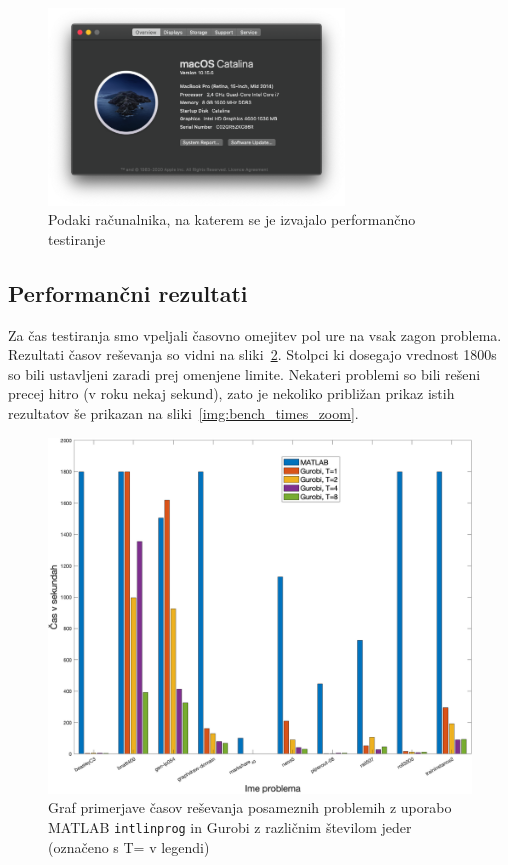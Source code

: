 \documentclass[a4paper,11pt]{article}
\begin{document}
\begin{figure}[htpb]
	\centering
	\includegraphics[width=0.7\textwidth]{images/davids-mbp.png}
	\caption{Podaki računalnika, na katerem se je izvajalo performančno testiranje}
	\label{img:davids_mbp}
\end{figure}

\subsection{Performančni rezultati}
Za čas testiranja smo vpeljali časovno omejitev pol ure na vsak zagon problema. Rezultati časov reševanja so vidni na sliki~\ref{img:bench_times}. Stolpci ki dosegajo vrednost 1800s so bili ustavljeni zaradi prej omenjene limite. Nekateri problemi so bili rešeni precej hitro (v roku nekaj sekund), zato je nekoliko približan prikaz istih rezultatov še prikazan na sliki~\ref{img:bench_times_zoom}.
\begin{figure}[htpb]
	\centering
	\includegraphics[width=\textwidth]{images/benchmark_times.png}
	\caption{Graf primerjave časov reševanja posameznih problemih z uporabo MATLAB \texttt{intlinprog} in Gurobi z različnim številom jeder (označeno s T= v legendi)}
	\label{img:bench_times}
\end{figure}
\end{document}
